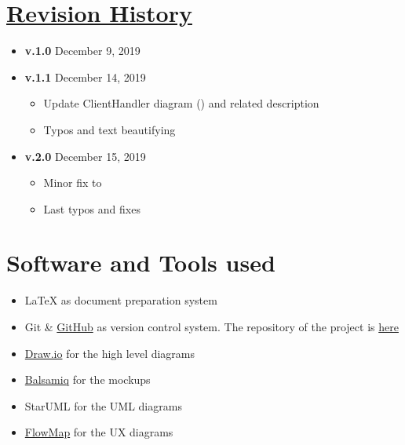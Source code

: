 \begin{appendices}
	\section[Revision History]{\hyperlink{toc}{Revision History}}
		\label{sec:revisionHistory}
		
		\begin{itemize}
			\item \textbf{v.1.0} December 9, 2019
			\item \textbf{v.1.1} December 14, 2019
				\begin{itemize}
					\item Update ClientHandler diagram () and related description
					
					\item Typos and text beautifying
				\end{itemize}
			\item \textbf{v.2.0} December 15, 2019
				\begin{itemize}
					\item Minor fix to 
					\item Last typos and fixes
				\end{itemize}
		\end{itemize}
		
	\section{Software and Tools used}
		\label{sec:softwareAndTools}
		
		\begin{itemize}
			\item \LaTeX{} as document preparation system
			\item Git \& \href{https://github.com/}{GitHub} as version control system. The repository of the project is \href{https://github.com/Megapiro/PaccianiPiro}{here}
			\item \href{https://www.draw.io/}{Draw.io} for the high level diagrams
			\item \href{https://balsamiq.com/}{Balsamiq} for the mockups
			\item StarUML for the UML diagrams
			\item \href{https://flowmapp.com/}{FlowMap} for the UX diagrams
		\end{itemize}		
\end{appendices}